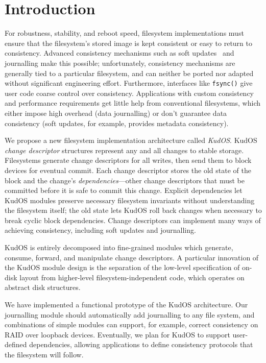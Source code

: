 
\section*{Introduction}
\label{sec:intro}

For robustness, stability, and reboot speed, filesystem implementations
must ensure that the filesystem's stored image is kept consistent
or easy to return to consistency.
%
Advanced consistency mechanisms such as soft updates~\cite{ganger00soft}
and journalling make this possible; unfortunately,
%
consistency mechanisms are generally tied to a particular filesystem, and
can neither be ported nor adapted without significant engineering
effort.
%
Furthermore, interfaces like \verb+fsync()+ give user code coarse control
over consistency.
%
Applications with custom consistency and performance requirements get
little help from conventional filesystems, which either impose high
overhead (data journalling) or don't guarantee data consistency (soft
updates, for example, provides metadata consistency).



We propose a new filesystem implementation architecture called
\emph{KudOS}.
%
KudOS \emph{change descriptor} structures represent any and all changes to
stable storage.
%
Filesystems generate change descriptors for all writes, then
send them to block devices for eventual commit.
%
Each change descriptor stores the old state of the block and the change's
\emph{dependencies}---other change descriptors that must be committed before
it is safe to commit this change.
%
Explicit dependencies let KudOS modules preserve necessary filesystem
invariants without understanding the filesystem itself; the old state
lets KudOS roll back changes when necessary to break cyclic block dependencies.
%
Change descriptors can implement many ways of achieving
consistency, including soft updates and journalling.

KudOS is entirely decomposed into fine-grained modules which generate, consume,
forward, and manipulate change descriptors. A particular innovation of the KudOS
module design is the separation of the low-level specification of on-disk layout
from higher-level filesystem-independent code, which operates on abstract disk
structures.

We have implemented a functional prototype of the KudOS
architecture.
%
Our journalling module should automatically add journalling to any file
system, and combinations of simple modules can support, for example,
correct consistency on RAID over loopback devices.
%
Eventually, we plan for KudOS to support user-defined dependencies,
allowing applications to define consistency protocols that the filesystem
will follow.

%
%
